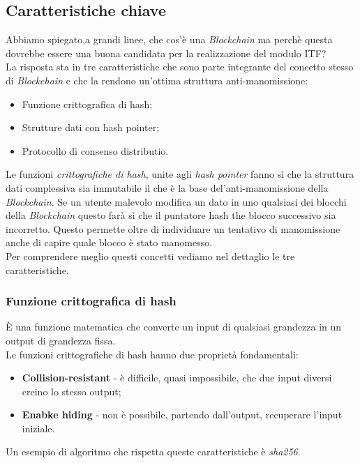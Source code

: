 \subsection{Caratteristiche chiave}
Abbiamo spiegato,a grandi linee, che cos'è una \textit{Blockchain} ma perchè questa dovrebbe essere una buona candidata per la realizzazione del modulo \gls{ITF}?\\
La risposta sta in tre caratteristiche che sono parte integrante del concetto stesso di \textit{Blockchain} e che la rendono un'ottima struttura anti-manomissione:
\begin{itemize}
	\item Funzione crittografica di hash;
	\item Strutture dati con hash pointer;
	\item Protocollo di consenso distributio.
\end{itemize}
Le funzioni \textit{crittografiche di hash}, unite agli \textit{hash pointer} fanno sì che la struttura dati complessiva sia immutabile il che è la base del'anti-manomissione della \textit{Blockchain}.
Se un utente malevolo modifica un dato in uno qualsiasi dei blocchi della \textit{Blockchain} questo farà sì che il puntatore hash the blocco successivo sia incorretto. Questo permette oltre di individuare un tentativo di manomissione anche di capire quale blocco è stato manomesso.\\
Per comprendere meglio questi concetti vediamo nel dettaglio le tre caratteristiche.
\subsubsection{Funzione crittografica di hash}
È una funzione matematica che converte un input di qualsiasi grandezza in un output di grandezza fissa.\\
Le funzioni crittografiche di hash hanno due proprietà fondamentali:
\begin{itemize}
	\item \textbf{Collision-resistant} - è difficile, quasi impossibile, che due input diversi creino lo stesso output;
	\item \textbf{Enabke hiding} - non è possibile, partendo dall'output, recuperare l'input iniziale.
\end{itemize}
Un esempio di algoritmo che rispetta queste caratteristiche è \emph{\gls{sha256}}\glsfirstoccur.

